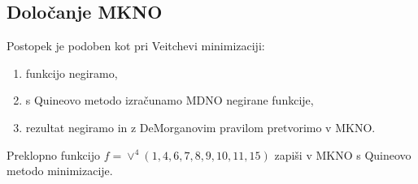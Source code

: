 \subsection{Določanje MKNO}
Postopek je podoben kot pri Veitchevi minimizaciji:
\begin{enumerate}
\item funkcijo negiramo,
\item s Quineovo metodo izračunamo MDNO negirane funkcije,
\item rezultat negiramo in z DeMorganovim pravilom pretvorimo v MKNO.
\end{enumerate}

\begin{zgled}
Preklopno funkcijo
$
f = \vee^4(1,4,6,7,8,9,10,11,15)
$
zapiši v MKNO s Quineovo metodo minimizacije.
\end{zgled}

